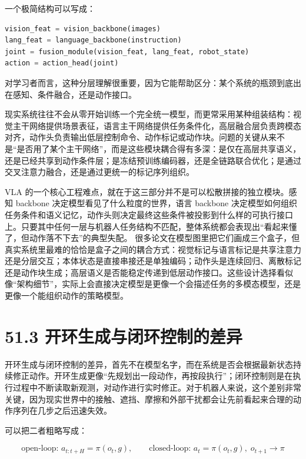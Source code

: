 一个极简结构可以写成：

\begin{lstlisting}[language=python]
vision_feat = vision_backbone(images)
lang_feat = language_backbone(instruction)
joint = fusion_module(vision_feat, lang_feat, robot_state)
action = action_head(joint)
\end{lstlisting}

对学习者而言，这种分层理解很重要，因为它能帮助区分：某个系统的瓶颈到底出在感知、条件融合，还是动作接口。

现实系统往往不会从零开始训练一个完全统一模型，而更常采用某种组装结构：视觉主干网络提供场景表征，语言主干网络提供任务条件化，高层融合层负责跨模态对齐，动作头负责输出低层控制命令、动作标记或动作块。问题的关键从来不是“是否用了某个主干网络”，而是这些模块耦合得有多深：是仅在高层共享语义，还是已经共享到动作条件层；是冻结预训练编码器，还是全链路联合优化；是通过交叉注意力融合，还是通过更统一的标记序列组织。

VLA 的一个核心工程难点，就在于这三部分并不是可以松散拼接的独立模块。感知 backbone 决定模型看见了什么粒度的世界，语言 backbone 决定模型如何组织任务条件和语义记忆，动作头则决定最终这些条件被投影到什么样的可执行接口上。只要其中任何一层与机器人任务结构不匹配，整体系统都会表现出“看起来懂了，但动作落不下去”的典型失配。 很多论文在模型图里把它们画成三个盒子，但真实系统里最难的恰恰是盒子之间的耦合方式：视觉标记与语言标记是共享注意力还是分层交互；本体状态是直接串接还是单独编码；动作头是连续回归、离散标记还是动作块生成；高层语义是否能稳定传递到低层动作接口。这些设计选择看似像“架构细节”，实际上会直接决定模型是更像一个会描述任务的多模态模型，还是更像一个能组织动作的策略模型。

\section*{51.3 开环生成与闭环控制的差异}


开环生成与闭环控制的差异，首先不在模型名字，而在系统是否会根据最新状态持续修正动作。开环生成更像“先规划出一段动作，再按段执行”；闭环控制则是在执行过程中不断读取新观测，对动作进行实时修正。对于机器人来说，这个差别非常关键，因为现实世界中的接触、遮挡、摩擦和外部干扰都会让先前看起来合理的动作序列在几步之后迅速失效。

可以把二者粗略写成：

\begingroup
\scriptsize
\begin{equation*}
\text{open-loop: } a_{t:t+H} = \pi(o_t, g), \qquad
\text{closed-loop: } a_t = \pi(o_t, g),\; o_{t+1}\rightarrow \pi
\end{equation*}
\endgroup


